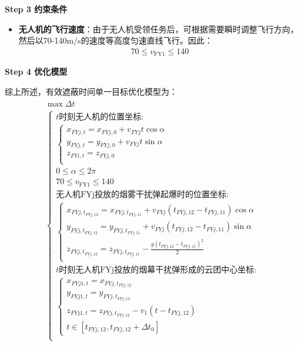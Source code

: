 \documentclass[../main.tex]{subfiles}
\begin{document}
\textbf{Step 3 约束条件}
\begin{itemize}
\item \textbf{无人机的飞行速度}：由于无人机受领任务后，可根据需要瞬时调整飞行方向，然后以70-140m/s的速度等高度匀速直线飞行。因此：
\begin{align}\label{11.8}
  70 \leq v_{\text{FY1}} \leq 140
\end{align}
\end{itemize}
\textbf{Step 4 优化模型}
\par 综上所述，有效遮蔽时间单一目标优化模型为：
\begin{align}
  \begin{array}{c}
	 \max \Delta t
  \\
\left\{ \begin{array}{l}
	t\text{时刻无人机的位置坐标:}\\
	\left\{ \begin{array}{l}
x_{FYj,t} = x_{FYj,0} + v_{FYj} t \cos\alpha \\
y_{FYj,t} = y_{FYj,0} + v_{FYj} t \sin\alpha \\
z_{FYi,t} = z_{FYj,0}\\
\end{array} \right.\\
	0\leq \alpha \leq 2\pi \\
  70 \leq v_{\text{FY1}} \leq 140\\
	\text{无人机FYj投放的烟雾干扰弹起爆时的位置坐标:}\\
	\left\{ \begin{array}{l}
	x_{FYj,t_{FYj,12}}=x_{FYj,t_{FYj,11}}+v_{FYj}\left( t_{FYj,12}-t_{FYj,11} \right) \cos \alpha\\
	y_{FYj,t_{FYj,12}}=y_{FYj,t_{FYj,11}}+v_{FYj}\left( t_{FYj,12}-t_{FYj,11} \right) \sin \alpha\\
	z_{FYj,t_{FYj,12}}=z_{FYj,t_{FYj,11}}-\frac{g\left( t_{FYj,12}-t_{FYj,11} \right) ^2}{2}\\
\end{array} \right. \\
	t\text{时刻无人机FYj投放的烟幕干扰弹形成的云团中心坐标:}\\
	\left\{ \begin{array}{l}
	x_{FYj1,t}=x_{FYj,t_{FYj,12}}\\
	y_{FYj1,t}=y_{FYj,t_{FYj,12}}\\
	z_{FYj1,t}=z_{FYj,t_{FYj,12}}-v_1\left( t-t_{FYj,12} \right)\\
	t\in \left[ t_{FYj,12},t_{FYj,12}+\Delta t_0 \right]
\end{array} \right.\\

\end{array}
\end{array}
\end{align}
\end{document}
